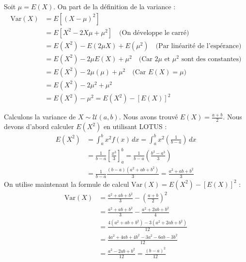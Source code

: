 \begin{proofbox}
Soit $\mu = E(X)$. On part de la définition de la variance :
\begin{align*}
\text{Var}(X) &= E[ (X - \mu)^2 ] \\
&= E[ X^2 - 2X\mu + \mu^2 ] \quad \text{(On développe le carré)} \\
&= E(X^2) - E(2\mu X) + E(\mu^2) \quad \text{(Par linéarité de l'espérance)} \\
&= E(X^2) - 2\mu E(X) + \mu^2 \quad \text{(Car $2\mu$ et $\mu^2$ sont des constantes)} \\
&= E(X^2) - 2\mu(\mu) + \mu^2 \quad \text{(Car $E(X) = \mu$)} \\
&= E(X^2) - 2\mu^2 + \mu^2 \\
&= E(X^2) - \mu^2 = E(X^2) - [E(X)]^2
\end{align*}
\end{proofbox}

\begin{examplebox}
Calculons la variance de $X \sim \mathcal{U}(a, b)$.
Nous avons trouvé $E(X) = \frac{a+b}{2}$.
Nous devons d'abord calculer $E(X^2)$ en utilisant LOTUS :
\begin{align*}
E(X^2) &= \int_a^b x^2 f(x) \, dx = \int_a^b x^2 \left( \frac{1}{b-a} \right) \, dx \\
&= \frac{1}{b-a} \left[ \frac{x^3}{3} \right]_a^b = \frac{1}{b-a} \left( \frac{b^3 - a^3}{3} \right) \\
&= \frac{1}{b-a} \frac{(b-a)(a^2+ab+b^2)}{3} = \frac{a^2+ab+b^2}{3}
\end{align*}
On utilise maintenant la formule de calcul $\text{Var}(X) = E(X^2) - [E(X)]^2$ :
\begin{align*}
\text{Var}(X) &= \frac{a^2+ab+b^2}{3} - \left( \frac{a+b}{2} \right)^2 \\
&= \frac{a^2+ab+b^2}{3} - \frac{a^2+2ab+b^2}{4} \\
&= \frac{4(a^2+ab+b^2) - 3(a^2+2ab+b^2)}{12} \\
&= \frac{4a^2+4ab+4b^2 - 3a^2-6ab-3b^2}{12} \\
&= \frac{a^2-2ab+b^2}{12} = \frac{(b-a)^2}{12}
\end{align*}
\end{examplebox}